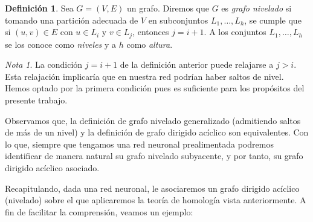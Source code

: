 \documentclass[12pt, a4paper, twoside]{book}
\numberwithin{equation}{section}
\theoremstyle{definition}
\newtheorem{defi}{Definición}[section]
\theoremstyle{remark}
\newtheorem*{remark}{Nota}
\theoremstyle{plain}
\begin{document}
	\begin{defi}
		Sea $G=(V, E)$ un grafo. Diremos que $G$ es 
		\textit{grafo nivelado} si tomando una partición adecuada de 
		$V$ en 
		subconjuntos $L_{1},\dots,L_{h}$, se cumple que si $(u,v) \in 
		E$ con $u \in L_{i}$ y $v \in L_{j}$, entonces $j=i+1$. A los 
		conjuntos $L_{1},\dots,L_{h}$ se los conoce como 
		\textit{niveles} y a $h$ como \textit{altura}.
	\end{defi}

	\begin{remark}
		La condición $j=i+1$ de la definición anterior puede relajarse
		a $j>i$. Esta relajación implicaría que en nuestra red podrían
		haber saltos de nivel. Hemos optado por la primera condición 
		pues es suficiente para los propósitos del presente trabajo.
	\end{remark}

	Observamos que, la definición de 
	grafo nivelado generalizado (admitiendo saltos de más de un nivel) y 
	la definición de grafo dirigido acíclico son 
	equivalentes. Con lo que, siempre que tengamos una red neuronal 
	prealimentada podremos identificar de manera natural su grafo nivelado
	subyacente, y por tanto, su grafo dirigido acíclico asociado.

	Recapitulando, dada una red neuronal, le asociaremos un grafo dirigido
	acíclico (nivelado) sobre el que aplicaremos la teoría de homología 
	vista anteriormente. A fin de facilitar la comprensión, veamos un 
	ejemplo:
\end{document}
